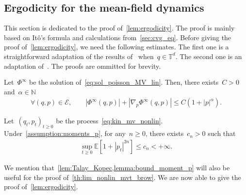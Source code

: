 \documentclass[onefignum,onetabnum]{siamart251216} %
\newcommand{\expect}{\mathbb E}
\newcommand{\torus}{\mathbb T}
\newcommand{\mc}[1]{\mathcal{#1}}
\renewcommand{\leq}{\leqslant}
\renewcommand{\geq}{\geqslant}
\newcommand{\SolPois}{\Phi^\infty}
\theoremstyle{plain}
\numberwithin{equation}{section}
\numberwithin{theorem}{section}
\begin{document}
\subsection{Ergodicity for the mean-field dynamics}
\label{subsec:ergo_nonlin}
This section is dedicated to the proof of~\cref{lem:ergodicity}. The proof is mainly based on It\^{o}'s  formula and calculations from~\cref{sec:cvg_eq}. Before giving the proof of~\cref{lem:ergodicity}, we need the following estimates. The first one is a straightforward adaptation of the results of~\cite{talay2002stochastic,kopec2015weak} when~$q\in\torus^d$. The second one is an adaptation of~\cite[Lemma 3.4]{chaintron2021propagationII}. The proofs are ommitted for brevity.
\begin{lemma}
    \label{lem:Talay_Kopec}
    Let~$\SolPois$ be the solution of~\eqref{eq:sol_poisson_MV_lin}. Then, there exists~$C>0$ and~$\alpha \in\mathbb{N}$
    \begin{align}
    \label{eq:borne_Poisson}
    \forall (q,p) \in \mc{E},\qquad |\SolPois(q,p)| + |\nabla_p \SolPois(q,p)| \leq C(1+|p|^\alpha).
    \end{align}
\end{lemma}
\begin{lemma}
    \label{lemma:bound_moment_p}
    Let~$(q_t,p_t)_{t\geq 0}$ be the process~\eqref{eq:kin_mv_nonlin}.
    Under~\cref{assumption:moments_p}, for any~$n\geq0$, there exists~$c_n >0$ such that
    \begin{align}
        \label{eq:bound_moment_p}
        \sup_{t\geq0}\expect\!\left[1+|p_t|^{2n}\right] \leq c_n < +\infty.
    \end{align}
\end{lemma}
We mention that~\cref{lem:Talay_Kopec,lemma:bound_moment_p} will also be useful for the proof of~\cref{th:lim_nonlin_mvt_brow}. We are now able to give the proof of~\cref{lem:ergodicity}.
\end{document}
